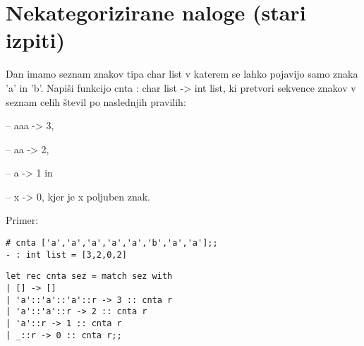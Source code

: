 \chapter[Nekategorizirano]{Nekategorizirane naloge (stari  izpiti)}
\begin{ex}
Dan imamo seznam znakov tipa char list v katerem se lahko pojavijo samo znaka 'a' in 'b'. Napi\v si funkcijo cnta : char list -> int list, ki pretvori sekvence znakov v seznam celih 
\v stevil po naslednjih pravilih:

    -- aaa -> 3,
    
    -- aa -> 2,
    
    -- a -> 1 in
    
    -- x -> 0, kjer je x poljuben znak.

Primer:

\begin{verbatim}
# cnta ['a','a','a','a','a','b','a','a'];;
- : int list = [3,2,0,2]
\end{verbatim}

\begin{sol}
\begin{verbatim}
let rec cnta sez = match sez with
| [] -> []
| 'a'::'a'::'a'::r -> 3 :: cnta r 
| 'a'::'a'::r -> 2 :: cnta r 
| 'a'::r -> 1 :: cnta r 
| _::r -> 0 :: cnta r;;
\end{verbatim}
\end{sol}

\end{ex} 
